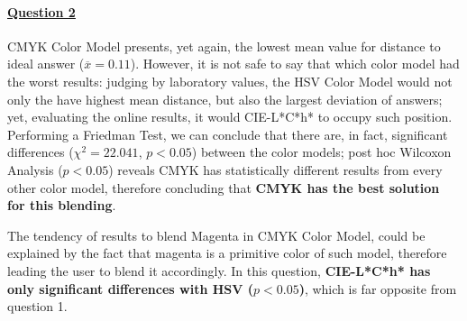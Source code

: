 \paragraph{\ul{Question 2}}
%
CMYK Color Model presents, yet again, the lowest mean value for distance to ideal answer ($\overline{x} = 0.11$).
However, it is not safe to say that which color model had the worst results: judging by laboratory values, the HSV Color Model would not only
the have highest mean distance, but also the largest deviation of answers; yet, evaluating the online results, it would CIE-L*C*h* to occupy
such position. Performing a Friedman Test, we can conclude that there are, in fact, significant differences ($\chi^2 = 22.041$, $p < 0.05$) between
the color models; post hoc Wilcoxon Analysis ($p < 0.05$) reveals CMYK has statistically different results from every other color model, therefore
concluding that \textbf{CMYK has the best solution for this blending}.\par
%
The tendency of results to blend Magenta in CMYK Color Model, could be explained by the fact that magenta is a primitive color of such model,
therefore leading the user to blend it accordingly. In this question, \textbf{CIE-L*C*h* has only significant differences with HSV ($p < 0.05$)},
which is far opposite from question 1.
%
